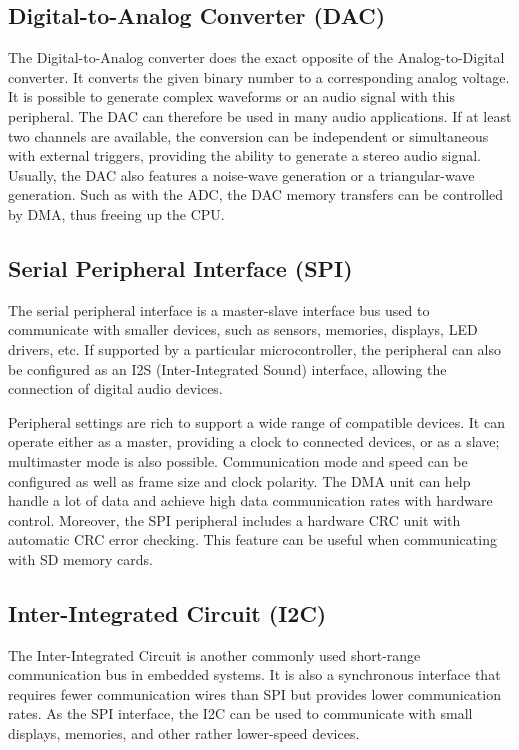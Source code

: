 	\subsection{Digital-to-Analog Converter (DAC)}
	\label{sub:dac}
The Digital-to-Analog converter does the exact opposite of the Analog-to-Digital converter. It converts the given binary number to a corresponding analog voltage. It is possible to generate complex waveforms or an audio signal with this peripheral. The DAC can therefore be used in many audio applications. If at least two channels are available, the conversion can be independent or simultaneous with external triggers, providing the ability to generate a stereo audio signal. Usually, the DAC also features a noise-wave generation or a triangular-wave generation. Such as with the ADC, the DAC memory transfers can be controlled by DMA, thus freeing up the CPU.

	\subsection{Serial Peripheral Interface (SPI)}
	\label{sub:spi}
The serial peripheral interface is a master-slave interface bus used to communicate with smaller devices, such as sensors, memories, displays, LED drivers, etc. If supported by a particular microcontroller, the peripheral can also be configured as an I2S (Inter-Integrated Sound) interface, allowing the connection of digital audio devices.

Peripheral settings are rich to support a wide range of compatible devices. It can operate either as a master, providing a clock to connected devices, or as a slave; multimaster mode is also possible. Communication mode and speed can be configured as well as frame size and clock polarity. The DMA unit can help handle a lot of data and achieve high data communication rates with hardware control. Moreover, the SPI peripheral includes a hardware CRC unit with automatic CRC error checking. This feature can be useful when communicating with SD memory cards.

	\subsection{Inter-Integrated Circuit (I2C)}
	\label{sub:i2c}
The Inter-Integrated Circuit is another commonly used short-range communication bus in embedded systems. It is also a synchronous interface that requires fewer communication wires than SPI but provides lower communication rates. As the SPI interface, the I2C can be used to communicate with small displays, memories, and other rather lower-speed devices.

